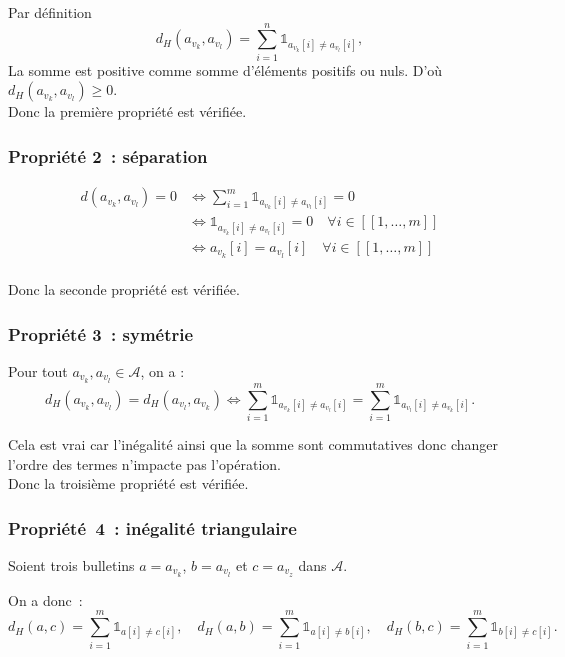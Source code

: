\documentclass[11pt]{article}
\begin{document}
Par définition 
\[
d_H(a_{v_k}, a_{v_l}) = \sum_{i=1}^n \mathbb{1}_{a_{v_k}[i] \neq a_{v_l}[i]},
\]
La somme est positive comme somme d'éléments positifs ou nuls.  
D’où $d_H(a_{v_k},a_{v_l}) \geq 0$.
\\

Donc la première propriété est vérifiée.


\subsubsection{Propriété 2~: séparation}

\begin{align*}
d(a_{v_k}, a_{v_l}) = 0
&\Leftrightarrow
\sum_{i=1}^m \mathbb{1}_{a_{v_k}[i] \neq a_{v_l}[i]} = 0 \\
&\Leftrightarrow
\mathbb{1}_{a_{v_k}[i] \neq a_{v_l}[i]} = 0 \quad \forall i \in [\![1, \ldots, m]\!] \\
&\Leftrightarrow
a_{v_k}[i] = a_{v_l}[i] \quad \forall i \in [\![1, \ldots, m]\!]
\end{align*}
\\

Donc la seconde propriété est vérifiée.


\subsubsection{Propriété 3~: symétrie}

Pour tout $a_{v_k}, a_{v_l} \in \mathcal{A}$, on a :
\[
d_H(a_{v_k}, a_{v_l}) = d_H(a_{v_l}, a_{v_k})
\Leftrightarrow
\sum_{i=1}^m \mathbb{1}_{a_{v_k}[i] \neq a_{v_l}[i]} = 
\sum_{i=1}^m \mathbb{1}_{a_{v_l}[i] \neq a_{v_k}[i]}.
\]

Cela est vrai car l’inégalité ainsi que la somme sont commutatives donc changer l'ordre des termes n'impacte pas l'opération.
\\

Donc la troisième propriété est vérifiée. 

\subsubsection{Propriété 4 : inégalité triangulaire}

Soient trois bulletins $a = a_{v_k}$, $b = a_{v_l}$ et $c = a_{v_z}$ dans $\mathcal{A}$.

On a donc :
\[
d_H(a,c) = \sum_{i=1}^m \mathbb{1}_{a[i] \neq c[i]},
\quad
d_H(a,b) = \sum_{i=1}^m \mathbb{1}_{a[i] \neq b[i]},
\quad
d_H(b,c) = \sum_{i=1}^m \mathbb{1}_{b[i] \neq c[i]}.
\]
\end{document}
